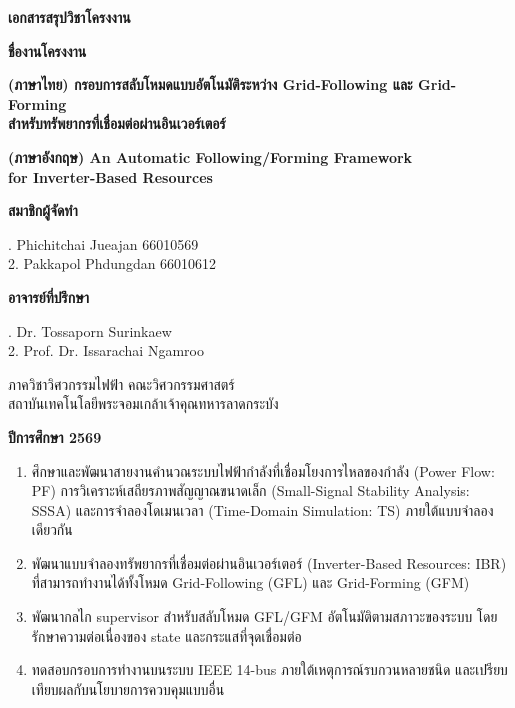 \documentclass[12pt,a4paper]{article}
\newcommand{\templateheading}[1]{\vspace{0.55em}\noindent{\fontsize{18}{22}\selectfont\bfseries #1}\par\vspace{0.25em}}
\begin{document}
\begin{titlepage}
\thispagestyle{empty}
\begin{center}
\vspace*{0.20in}
{\fontsize{26}{31}\selectfont\bfseries เอกสารสรุปวิชาโครงงาน\par}
\vspace{0.32in}
{\fontsize{18}{22}\selectfont\bfseries ชื่องานโครงงาน\par}
\vspace{0.12in}
{\fontsize{19}{24}\selectfont\bfseries
(ภาษาไทย) กรอบการสลับโหมดแบบอัตโนมัติระหว่าง Grid-Following และ Grid-Forming\\
สำหรับทรัพยากรที่เชื่อมต่อผ่านอินเวอร์เตอร์\par}
\vspace{0.13in}
{\fontsize{17}{21}\selectfont\bfseries
(ภาษาอังกฤษ) An Automatic Following/Forming Framework\\
for Inverter-Based Resources\par}
\vspace{0.38in}
{\fontsize{18}{22}\selectfont\bfseries สมาชิกผู้จัดทำ\par}
\vspace{0.08in}
{\fontsize{17}{21}. Phichitchai Jueajan \hspace{0.35in} 66010569\\
2. Pakkapol Phdungdan \hspace{0.35in} 66010612\par}
\vspace{0.28in}
{\fontsize{18}{22}\selectfont\bfseries อาจารย์ที่ปรึกษา\par}
\vspace{0.08in}
{\fontsize{17}{21}. Dr. Tossaporn Surinkaew\\
2. Prof. Dr. Issarachai Ngamroo\par}
\vfill
{\fontsize{15}{19}\selectfont
ภาควิชาวิศวกรรมไฟฟ้า คณะวิศวกรรมศาสตร์\\
สถาบันเทคโนโลยีพระจอมเกล้าเจ้าคุณทหารลาดกระบัง\par}
\vspace{0.15in}
{\fontsize{17}{21}\selectfont\bfseries ปีการศึกษา 2569\par}
\end{center}
\end{titlepage}
\templateheading{วัตถุประสงค์ของโครงงาน}
\begin{enumerate}
\item ศึกษาและพัฒนาสายงานคำนวณระบบไฟฟ้ากำลังที่เชื่อมโยงการไหลของกำลัง (Power Flow: PF) การวิเคราะห์เสถียรภาพสัญญาณขนาดเล็ก (Small-Signal Stability Analysis: SSSA) และการจำลองโดเมนเวลา (Time-Domain Simulation: TS) ภายใต้แบบจำลองเดียวกัน
\item พัฒนาแบบจำลองทรัพยากรที่เชื่อมต่อผ่านอินเวอร์เตอร์ (Inverter-Based Resources: IBR) ที่สามารถทำงานได้ทั้งโหมด Grid-Following (GFL) และ Grid-Forming (GFM)
\item พัฒนากลไก supervisor สำหรับสลับโหมด GFL/GFM อัตโนมัติตามสภาวะของระบบ โดยรักษาความต่อเนื่องของ state และกระแสที่จุดเชื่อมต่อ
\item ทดสอบกรอบการทำงานบนระบบ IEEE 14-bus ภายใต้เหตุการณ์รบกวนหลายชนิด และเปรียบเทียบผลกับนโยบายการควบคุมแบบอื่น
\end{enumerate}
\end{document}

